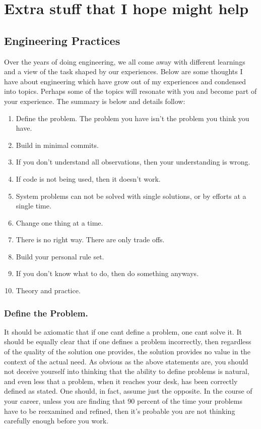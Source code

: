 
\appendix
{}
\chapter{Extra stuff that I hope might help}
\label{introA} %

\section{Engineering Practices}
\label{sec:A1}
Over the years of doing engineering, we all come away with different learnings and a view of the task shaped by our experiences.
Below are some thoughts I have about engineering which have grow out of my experiences and condensed into topics. Perhaps some
of the topics will resonate with you and become part of your experience. The summary is below and details follow:
\begin{enumerate}
\item Define the problem. The problem you have isn't the problem you think you have.
\item Build in minimal commits.
\item If you don't understand all observations, then your understanding is wrong.
\item If code is not being used, then it doesn't work.
\item System problems can not be solved with single solutions, or by efforts at a single time.
\item Change one thing at a time.
\item There is no right way. There are only trade offs.
\item Build your personal rule set.
\item If you don't know what to do, then do something anyways.
\item Theory and practice.
\end{enumerate}

\subsection{Define the Problem.}
\label{sec:A2}
It should be axiomatic that if one cant define a problem, one cant solve it. It should be equally clear that if one defines a
problem incorrectly, then regardless of the quality of the solution one provides, the solution provides no value in the context of
the actual need.
As obvious as the above statements are, you should not deceive yourself into thinking that the ability to define
problems is natural, and even less that a problem, when it reaches your desk, has been correctly defined as stated. One should, in fact,
assume just the opposite.
In the course of your career, unless you are finding that 90 percent of the time your problems have to be reexamined and refined,
then it's probable you are not thinking carefully enough before you work.

